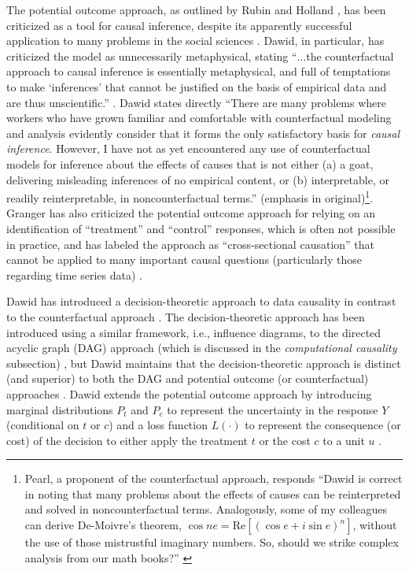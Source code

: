 The potential outcome approach, as outlined by Rubin and Holland \cite{Rubin1974,Holland1986}, has been criticized as a tool for causal inference, despite its apparently successful application to many problems in the social sciences \cite{Morgan2014,Imbens2015}.  Dawid, in particular, has criticized the model as unnecessarily metaphysical, stating ``$\ldots$the counterfactual approach to causal inference is essentially metaphysical, and full of temptations to make `inferences' that cannot be justified on the basis of empirical data and are thus unscientific.'' \cite{Dawid2000}.  Dawid states directly  ``There are many problems where workers who have grown familiar and comfortable with counterfactual modeling and analysis evidently consider that it forms the only satisfactory basis for {\em causal inference}. However, I have not as yet encountered any use of counterfactual models for inference about the effects of causes that is not either (a) a goat, delivering misleading inferences of no empirical content, or (b) interpretable, or readily reinterpretable, in noncounterfactual terms.'' \cite{Dawid2000} (emphasis in original)\footnote{Pearl, a proponent of the counterfactual approach, responds ``Dawid is correct in noting that many problems about the effects of causes can be reinterpreted and solved in noncounterfactual terms. Analogously, some of my colleagues can derive De-Moivre's theorem, $\cos ne = \mathrm{Re}[(\cos e +i \sin e)^n]$, without the use of those mistrustful imaginary numbers. So, should we strike complex analysis from our math books?'' \cite{Pearl2000c}}.  Granger has also criticized the potential outcome approach for relying on an identification of ``treatment'' and ``control'' responses, which is often not possible in practice, and has labeled the approach as ``cross-sectional causation'' that cannot be applied to many important causal questions (particularly those regarding time series data) \cite{Granger1986}.

Dawid has introduced a decision-theoretic approach to data causality in contrast to the counterfactual approach \cite{Dawid2002,Dawid2000}.  The decision-theoretic approach has been introduced using a similar framework, i.e., influence diagrams, to the directed acyclic graph (DAG) approach (which is discussed in the {\em computational causality} subsection) \cite{Dawid2002}, but Dawid maintains that the decision-theoretic approach is distinct (and superior) to both the DAG and potential outcome (or counterfactual) approaches \cite{Dawid2007,Dawid2010}.  Dawid extends the potential outcome approach by introducing marginal distributions $P_t$ and $P_c$ to represent the uncertainty in the response $Y$ (conditional on $t$ or $c$) and a loss function $L(\cdot)$ to represent the consequence (or cost) of the decision to either apply the treatment $t$ or the cost $c$ to a unit $u$ \cite{Dawid2000,Illari2011Dawid}.

